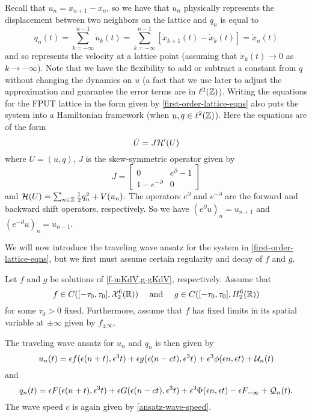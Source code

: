 Recall that \(u_{n} = x_{n+1} - x_n\), so we have that \(u_n\) physically represents the displacement between two neighbors on the lattice and \(q_n\) is equal to 
\begin{equation}
	q_n(t) = \sum_{k=-\infty}^{n-1} \dot u_k(t) = \sum_{k=-\infty}^{n-1} [\dot x_{k+1}(t) - \dot x_k(t)] = \dot x_n(t)
\end{equation}
and so represents the velocity at a lattice point (assuming that \(\dot x_k(t) \to 0\) as \(k\to-\infty\)). Note that we have the flexibility to add or subtract a constant from \(q\) without changing the dynamics on \(u\) (a fact that we use later to adjust the approximation and guarantee the error terms are in \(\ell^2(\mathbb{Z})\)). Writing the equations for the FPUT lattice in the form given by \cref{first-order-lattice-eqns} also puts the system into a Hamiltonian framework (when \(u, q\in\ell^2(\mathbb{Z})\)). Here the equations are of the form
\begin{equation}
	\dot U = J \mathcal{H}'(U)
\end{equation}
where \(U = (u,q)\), \(J\) is the skew-symmetric operator given by
\begin{equation}
	J = \begin{bmatrix}
		0 & e^\partial - 1 \\ 1 - e^{-\partial} & 0
	\end{bmatrix}
\end{equation}
and \(\mathcal{H}(U) = \sum_{n\in\mathbb{Z}} \frac 1 2 q_n^2 + V(u_n)\). The operators \(e^\partial\) and \(e^{-\partial}\) are the forward and backward shift operators, respectively. So we have \((e^\partial u)_n = u_{n+1}\) and \((e^{-\partial}u)_n = u_{n-1}\).

We will now introduce the traveling wave ansatz for the system in \cref{first-order-lattice-eqns}, but we first must assume certain regularity and decay of \(f\) and \(g\).
\begin{assum}\label{assumption-1}
	Let \(f\) and \(g\) be solutions of \cref{f-mKdV,g-gKdV}, respectively. Assume that \[f\in C([-\tau_0, \tau_0], \mathcal{X}_2^6(\mathbb{R})) \quad \text{ and } \quad g\in C([-\tau_0,\tau_0],H_2^6(\mathbb{R}))\] for some \(\tau_0>0\) fixed. Furthermore, assume that \(f\) has fixed limits in its spatial variable at \(\pm \infty\) given by \(f_{\pm \infty}\).
\end{assum}

The traveling wave ansatz for \(u_n\) and \(q_n\) is then given by
\begin{equation}\label{u-ansatz}
	u_n(t) = \epsilon f(\epsilon(n+t), \epsilon^3t) + \epsilon g(\epsilon(n-ct), \epsilon^3 t) + \epsilon^3 \phi(\epsilon n , \epsilon t) + \mathcal{U}_n(t)
\end{equation}
and 
\begin{equation}\label{q-ansatz}
	q_n(t) = \epsilon F(\epsilon(n+t), \epsilon^3 t) + \epsilon G(\epsilon(n-ct), \epsilon^3 t) + \epsilon^3 \Phi(\epsilon n, \epsilon t) - \epsilon F_{-\infty} + \mathcal{Q}_n(t).
\end{equation}
The wave speed \(c\) is again given by \cref{ansatz-wave-speed}. 

